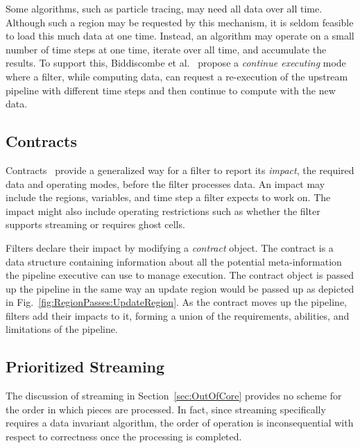 \documentclass[journal,onecolumn,12pt,letterpaper,twoside]{IEEEtran}
\newcommand*{\lcite}[1]{~\cite{#1}}
\newcommand*{\scite}[1]{~\cite{#1}}
\newcommand*{\figref}[1]{Fig.~\ref{#1}}
\newcommand*{\keyterm}[1]{\emph{#1}}
\newcommand{\etal}{et al.}
\begin{document}
Some algorithms, such as particle tracing, may need all data over all time.
Although such a region may be requested by this mechanism, it is seldom
feasible to load this much data at one time.  Instead, an algorithm may
operate on a small number of time steps at one time, iterate over all time,
and accumulate the results.  To support this, Biddiscombe
\etal\scite{Biddiscombe2007} propose a \keyterm{continue executing} mode
where a filter, while computing data, can request a re-execution of the
upstream pipeline with different time steps and then continue to compute
with the new data.

\subsection{Contracts}
\label{sec:Contracts}

Contracts\lcite{Childs2005} provide a generalized way for a filter to report
its \keyterm{impact}, the required data and operating modes, before the
filter processes data.  An impact may include the regions, variables, and
time step a filter expects to work on.  The impact might also include
operating restrictions such as whether the filter supports streaming or
requires ghost cells.

Filters declare their impact by modifying a \keyterm{contract} object.  The
contract is a data structure containing information about all the potential
meta-information the pipeline executive can use to manage execution.  The
contract object is passed up the pipeline in the same way an update region
would be passed up as depicted in
\figref{fig:RegionPasses:UpdateRegion}.  As the contract moves up the
pipeline, filters add their impacts to it, forming a union of the
requirements, abilities, and limitations of the pipeline.

\subsection{Prioritized Streaming}
\label{sec:PrioritizedStreaming}

The discussion of streaming in Section~\ref{sec:OutOfCore} provides no
scheme for the order in which pieces are processed.  In fact, since
streaming specifically requires a data invariant algorithm, the order of
operation is inconsequential with respect to correctness once the
processing is completed.
\end{document}
